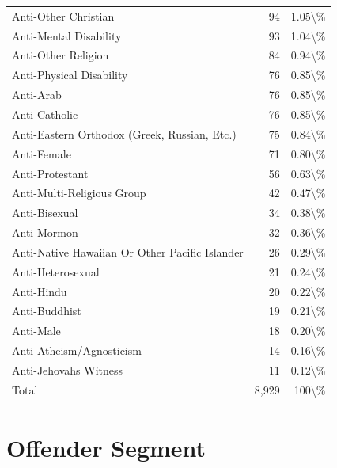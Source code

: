 \documentclass[
  12pt,
  openany]{book}
\begin{document}
\begin{longtable}[t]{lrr}
\addlinespace
Anti-Other Christian & 94 & 1.05\textbackslash{}\%\\
Anti-Mental Disability & 93 & 1.04\textbackslash{}\%\\
Anti-Other Religion & 84 & 0.94\textbackslash{}\%\\
Anti-Physical Disability & 76 & 0.85\textbackslash{}\%\\
Anti-Arab & 76 & 0.85\textbackslash{}\%\\
\addlinespace
Anti-Catholic & 76 & 0.85\textbackslash{}\%\\
Anti-Eastern Orthodox (Greek, Russian, Etc.) & 75 & 0.84\textbackslash{}\%\\
Anti-Female & 71 & 0.80\textbackslash{}\%\\
Anti-Protestant & 56 & 0.63\textbackslash{}\%\\
Anti-Multi-Religious Group & 42 & 0.47\textbackslash{}\%\\
\addlinespace
Anti-Bisexual & 34 & 0.38\textbackslash{}\%\\
Anti-Mormon & 32 & 0.36\textbackslash{}\%\\
Anti-Native Hawaiian Or Other Pacific Islander & 26 & 0.29\textbackslash{}\%\\
Anti-Heterosexual & 21 & 0.24\textbackslash{}\%\\
Anti-Hindu & 20 & 0.22\textbackslash{}\%\\
\addlinespace
Anti-Buddhist & 19 & 0.21\textbackslash{}\%\\
Anti-Male & 18 & 0.20\textbackslash{}\%\\
Anti-Atheism/Agnosticism & 14 & 0.16\textbackslash{}\%\\
Anti-Jehovahs Witness & 11 & 0.12\textbackslash{}\%\\
Total & 8,929 & 100\textbackslash{}\%\\
\bottomrule
\end{longtable}

\chapter{Offender Segment}\label{offender-segment-1}
\end{document}

